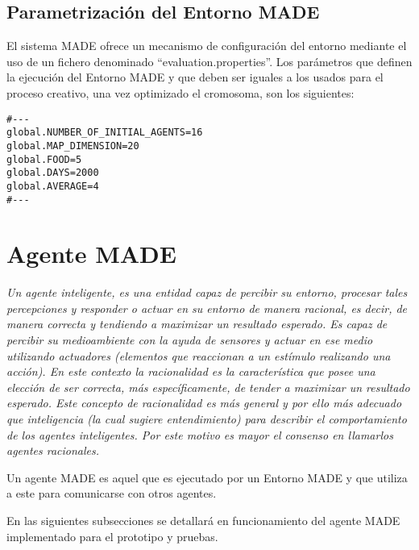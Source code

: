 \subsection{Parametrización del Entorno MADE}

El sistema MADE ofrece un mecanismo de configuración del entorno mediante el
uso de un fichero denominado ``evaluation.properties''. Los parámetros que
definen la ejecución del Entorno MADE y que deben ser iguales a los usados para
el proceso creativo, una vez optimizado el cromosoma, son los siguientes:

\begin{verbatim}
#---
global.NUMBER_OF_INITIAL_AGENTS=16
global.MAP_DIMENSION=20
global.FOOD=5
global.DAYS=2000
global.AVERAGE=4
#---
\end{verbatim}




\section{Agente MADE}

\textit{Un agente inteligente, es una entidad capaz de percibir su entorno, procesar tales percepciones y responder o actuar en su entorno de manera racional, es decir, de manera correcta y tendiendo a maximizar un resultado esperado. Es capaz de percibir su medioambiente con la ayuda de sensores y actuar en ese medio utilizando actuadores (elementos que reaccionan a un estímulo realizando una acción).
En este contexto la racionalidad es la característica que posee una elección de ser correcta, más específicamente, de tender a maximizar un resultado esperado. Este concepto de racionalidad es más general y por ello más adecuado que inteligencia (la cual sugiere entendimiento) para describir el comportamiento de los agentes inteligentes. Por este motivo es mayor el consenso en llamarlos agentes racionales.}

Un agente MADE es aquel que es ejecutado por un Entorno MADE y que utiliza a este para comunicarse con otros agentes.

En las siguientes subsecciones se detallará en funcionamiento del agente MADE implementado para el prototipo y pruebas.


